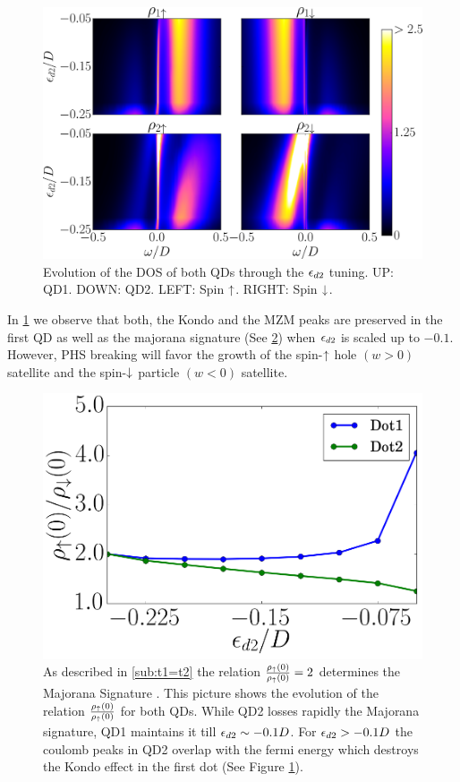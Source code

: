 \documentclass[showpacs,aps,prb,reprint,superscriptaddress]{revtex4-1}
\begin{document}
\begin{figure}[bt]
\centering
\includegraphics[scale=0.3]{Graficos/2Dhigh.png}
\caption{\label{fig:2D/Shift_ed2} Evolution of the DOS of both QDs through the $\epsilon_{d2}$ tuning. UP: QD1. DOWN: QD2. LEFT: Spin $\uparrow$. RIGHT: Spin $\downarrow$.}
\end{figure}


In \ref{fig:2D/Shift_ed2} we observe that both, the Kondo and the MZM peaks are preserved in the first QD as well as the majorana signature (See \ref{fig:ed2/Fermi}) when $\epsilon_{d2}$ is scaled up to $-0.1$.  However,  PHS breaking will favor the growth of the spin-$\uparrow$ hole $(w>0)$  satellite and the spin-$\downarrow$ particle $(w<0)$ satellite.


\begin{figure}[bt]
\centering
\includegraphics[scale=0.3]{Graficos/e2-Fermi.png}
\caption{\label{fig:ed2/Fermi} As described in \ref{sub:t1=t2} the relation $\frac{\rho_\uparrow(0)}{\rho_\uparrow(0)}=2$ determines the Majorana Signature . This picture shows the evolution of the relation $\frac{\rho_\uparrow(0)}{\rho_\uparrow(0)}$ for both QDs. While QD2 losses rapidly the Majorana signature, QD1 maintains it till $\epsilon_{d2}\sim -0.1D$. For  $\epsilon_{d2}>-0.1D$ the coulomb peaks in QD2 overlap with the fermi energy which destroys the Kondo effect in the first dot (See Figure \ref{fig:2D/Shift_ed2}). }

\end{figure}
\end{document}
